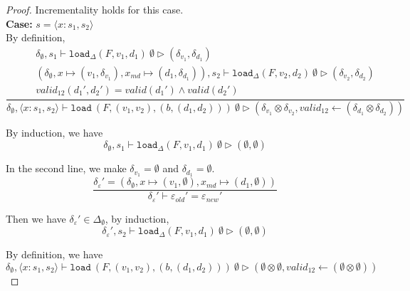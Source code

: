 \documentclass[10pt,twoside,a4paper]{article}
\theoremstyle{theorem}
\theoremstyle{lemma}
\theoremstyle{property}
\theoremstyle{definition}
\theoremstyle{assumption}
\begin{document}
\begin{proof}
		Incrementality holds for this case.\\

	\textbf{Case: } $s = \langle x : s_1, s_2 \rangle$\\

	By definition,
	\begin{displaymath}
	\frac{\begin{array}{c}
		\delta_{\emptyset}, s_1 \vdash \mathtt{load}_\Delta (F,v_1,d_1)~ \emptyset \rhd (\delta_{v_1},\delta_{d_1})\\
		(\delta_{\emptyset}, x \mapsto (v_1, \delta_{v_1}), x_{md} \mapsto (d_1, \delta_{d_1})), s_2 \vdash \mathtt{load}_\Delta (F,v_2,d_2)~ \emptyset \rhd (\delta_{v_2},\delta_{d_2})\\
		valid_{12}({d_1}',{d_2}') = valid({d_1}') \wedge valid({d_2}')
	\end{array}}
	{\delta_{\emptyset}, \langle x:s_1,s_2 \rangle \vdash \mathtt{load}~ (F,(v_1,v_2),(b,(d_1,d_2)))~ \emptyset \rhd (\delta_{v_1} \otimes \delta_{v_2},valid_{12} \leftarrow (\delta_{d_1} \otimes \delta_{d_2})) }
	\end{displaymath}

	By induction, we have
	\begin{displaymath}
		\delta_{\emptyset}, s_1 \vdash \mathtt{load}_\Delta (F,v_1,d_1)~ \emptyset \rhd (\emptyset,\emptyset)
	\end{displaymath}

	In the second line, we make $\delta_{v_1} = \emptyset $ and $ \delta_{d_1} = \emptyset$.
	\begin{displaymath}
	\frac{
		\delta_\varepsilon' = (\delta_{\emptyset}, x \mapsto (v_1, \emptyset), x_{md} \mapsto (d_1, \emptyset))
	}
	{	\delta_\varepsilon' \vdash \varepsilon_{old}' = \varepsilon_{new}' }
	\end{displaymath}

	Then we have $\delta_\varepsilon' \in \Delta_{\emptyset}$, by induction, 
	\begin{displaymath}
		\delta_\varepsilon', s_2 \vdash \mathtt{load}_\Delta (F,v_1,d_1)~ \emptyset \rhd (\emptyset,\emptyset)
	\end{displaymath}

	By definition, we have
	\begin{displaymath}
		\delta_{\emptyset}, \langle x:s_1,s_2 \rangle \vdash \mathtt{load}~ (F,(v_1,v_2),(b,(d_1,d_2)))~ \emptyset \rhd (\emptyset \otimes \emptyset,valid_{12} \leftarrow (\emptyset \otimes \emptyset)) 
	\end{displaymath}


\end{proof}
\end{document}
